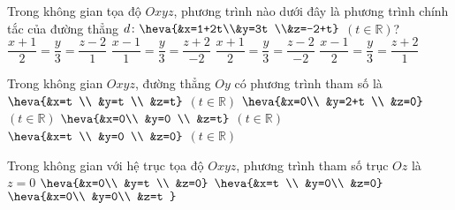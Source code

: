 	\begin{ex}%
		Trong không gian tọa độ $Oxyz$, phương trình nào dưới đây là phương trình chính tắc của đường thẳng $d\colon\heva{&x=1+2t\\&y=3t \\&z=-2+t}$ $(t\in\mathbb{R})$?
		\choice
		{$\dfrac{x+1}{2}=\dfrac{y}{3}=\dfrac{z-2}{1}$}
		{$\dfrac{x-1}{1}=\dfrac{y}{3}=\dfrac{z+2}{-2}$}
		{$\dfrac{x+1}{2}=\dfrac{y}{3}=\dfrac{z-2}{-2}$}
		{\True $\dfrac{x-1}{2}=\dfrac{y}{3}=\dfrac{z+2}{1}$}
\end{ex}
\begin{ex}%
	Trong không gian $Oxyz$, đường thẳng $Oy$ có phương trình tham số là
	\choice
	{$\heva{&x=t \\
		&y=t \\
		&z=t}$ $(t \in \mathbb{R})$} 
	{\True $\heva{&x=0\\
		&y=2+t \\
		&z=0}$ $(t \in \mathbb{R})$}
	{$\heva{&x=0\\
		&y=0 \\
		&z=t}$ $(t \in \mathbb{R})$}
	{$\heva{&x=t \\
		&y=0 \\
		&z=0}$ $(t \in \mathbb{R})$}
\end{ex}
\begin{ex}%
	Trong không gian với hệ trục tọa độ $Oxyz$, phương trình tham số trục $Oz$ là
	\choice
	{$z=0$}
	{$\heva{&x=0\\
			&y=t \\
			&z=0}$}
	{$\heva{&x=t \\
			&y=0\\
			&z=0}$}
	{\True $\heva{&x=0\\
			&y=0\\
			&z=t
			}$}
\end{ex}
